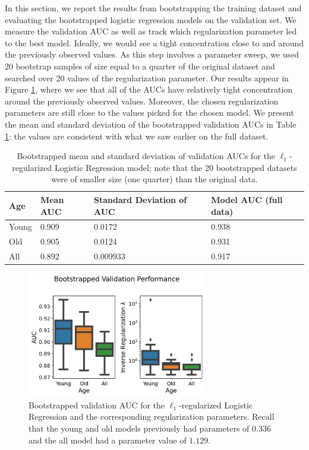 \documentclass[11pt, letterpaper]{amsart}
\begin{document}
In this section, we report the results from bootstrapping the training dataset and evaluating the bootstrapped logistic regression models on the validation set. We measure the validation AUC as well as track which regularization parameter led to the best model. Ideally, we would see a tight concentration close to and around the previously observed values. As this step involves a parameter sweep, we used 20 bootstrap samples of size equal to a quarter of the original dataset and searched over 20 values of the regularization parameter. Our results appear in Figure \ref{fig:lr_bootstrap_val}, where we see that all of the AUCs have relatively tight concentration around the previously observed values. Moreover, the chosen regularization parameters are still close to the values picked for the chosen model. We present the mean and standard deviation of the bootstrapped validation AUCs in Table \ref{tab:bs_auc}: the values are consistent with what we saw earlier on the full dataset. 
\begin{table}[h]
\begin{tabular}{llll}
Age & Mean AUC & Standard Deviation of AUC & Model AUC (full data) \\
\hline
Young & 0.909 & 0.0172 & 0.938 \\
Old & 0.905 & 0.0124 & 0.931 \\
All & 0.892 & 0.009933 & 0.917 
\end{tabular}
\caption{Bootstrapped mean and standard deviation of validation AUCs for the $\ell_1$-regularized Logistic Regression model; note that the 20 bootstrapped datasets were of smaller size (one quarter) than the original data.}\label{tab:bs_auc}
\end{table}
\begin{figure}
	\centering
	\includegraphics[width=0.7\textwidth]{lr_bootstrap_val.png}
	\caption{Bootstrapped validation AUC for the $\ell_1$-regularized Logistic Regression and the corresponding regularization parameters. Recall that the young and old models previously had parameters of $0.336$ and the all model had a parameter value of $1.129$.}\label{fig:lr_bootstrap_val}
\end{figure}
\end{document}
